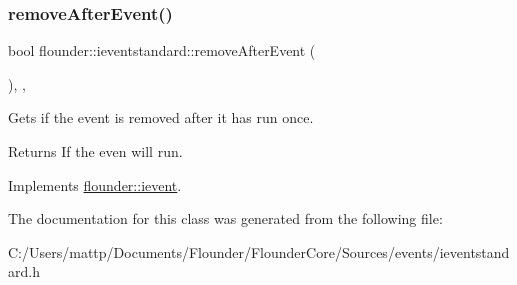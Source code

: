 \subsubsection{\texorpdfstring{remove\+After\+Event()}{removeAfterEvent()}}
{\footnotesize\ttfamily bool flounder\+::ieventstandard\+::remove\+After\+Event (\begin{DoxyParamCaption}{ }\end{DoxyParamCaption})\hspace{0.3cm}{\ttfamily [inline]}, {\ttfamily [override]}, {\ttfamily [virtual]}}



Gets if the event is removed after it has run once. 

\begin{DoxyReturn}{Returns}
If the even will run. 
\end{DoxyReturn}


Implements \hyperlink{classflounder_1_1ievent_a7017c8803df2397758980cb61020e801}{flounder\+::ievent}.



The documentation for this class was generated from the following file\+:\begin{DoxyCompactItemize}
\item 
C\+:/\+Users/mattp/\+Documents/\+Flounder/\+Flounder\+Core/\+Sources/events/ieventstandard.\+h\end{DoxyCompactItemize}
